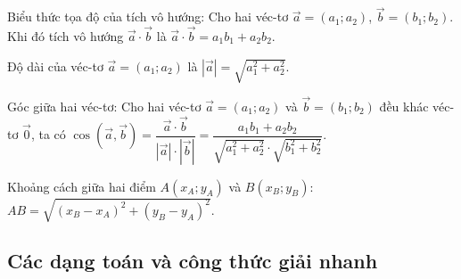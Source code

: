 \begin{dl}
Biểu thức tọa độ của tích vô hướng: Cho hai véc-tơ $\vec{ a} = (a_1 ;a_2)$, $\vec{b} = (b_1 ;b_2)$. Khi đó tích vô hướng $\vec{a} \cdot\vec{b}$ là $\vec{a} \cdot\vec{b} = a_1 b_1 +a_2 b_2.$
\end{dl}

\begin{dl}
Độ dài của véc-tơ $\vec{ a} = (a_1;a_2)$ là $| \vec{ a} | = \sqrt{a_1^2 + a_2^2}$.
\end{dl}

\begin{dl}
Góc giữa hai véc-tơ: Cho hai véc-tơ $\vec{ a} = (a_1 ;a_2)$ và $\vec{b} = (b_1 ;b_2)$ đều khác véc-tơ $\vec{0}$, ta có
$  \cos \left( \vec{a}, \vec{b} \right) = \dfrac{ \vec{a} \cdot\vec{b}}{| \vec{ a} | \cdot | \vec{ b} |} = \dfrac{a_1 b_1 +a_2 b_2}{\sqrt{a_1^2 + a_2^2} \cdot \sqrt{b_1^2 + b_2^2}}. $
\end{dl}

\begin{dl}
Khoảng cách giữa hai điểm $A(x_A;y_A)$ và $B(x_B;y_B)$:
$AB= \sqrt{(x_B-x_A)^2+(y_B-y_A)^2}.$
\end{dl}

\subsection{Các dạng toán và công thức giải nhanh}

